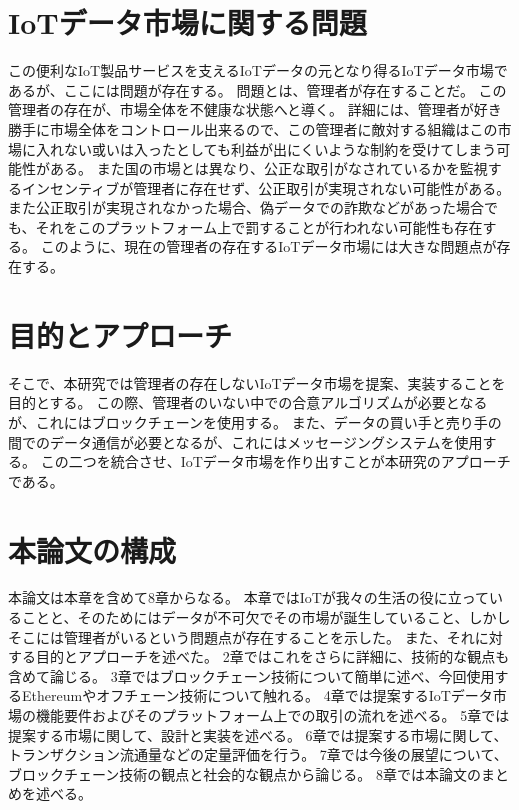 \section{IoTデータ市場に関する問題}
この便利なIoT製品サービスを支えるIoTデータの元となり得るIoTデータ市場であるが、ここには問題が存在する。
問題とは、管理者が存在することだ。
この管理者の存在が、市場全体を不健康な状態へと導く。
詳細には、管理者が好き勝手に市場全体をコントロール出来るので、この管理者に敵対する組織はこの市場に入れない或いは入ったとしても利益が出にくいような制約を受けてしまう可能性がある。
また国の市場とは異なり、公正な取引がなされているかを監視するインセンティブが管理者に存在せず、公正取引が実現されない可能性がある。
また公正取引が実現されなかった場合、偽データでの詐欺などがあった場合でも、それをこのプラットフォーム上で罰することが行われない可能性も存在する。
このように、現在の管理者の存在するIoTデータ市場には大きな問題点が存在する。

\section{目的とアプローチ}
そこで、本研究では管理者の存在しないIoTデータ市場を提案、実装することを目的とする。
この際、管理者のいない中での合意アルゴリズムが必要となるが、これにはブロックチェーンを使用する。
また、データの買い手と売り手の間でのデータ通信が必要となるが、これにはメッセージングシステムを使用する。
この二つを統合させ、IoTデータ市場を作り出すことが本研究のアプローチである。

\section{本論文の構成}
本論文は本章を含めて8章からなる。
本章ではIoTが我々の生活の役に立っていることと、そのためにはデータが不可欠でその市場が誕生していること、しかしそこには管理者がいるという問題点が存在することを示した。
また、それに対する目的とアプローチを述べた。
2章ではこれをさらに詳細に、技術的な観点も含めて論じる。
3章ではブロックチェーン技術について簡単に述べ、今回使用するEthereumやオフチェーン技術について触れる。
4章では提案するIoTデータ市場の機能要件およびそのプラットフォーム上での取引の流れを述べる。
5章では提案する市場に関して、設計と実装を述べる。
6章では提案する市場に関して、トランザクション流通量などの定量評価を行う。
7章では今後の展望について、ブロックチェーン技術の観点と社会的な観点から論じる。
8章では本論文のまとめを述べる。